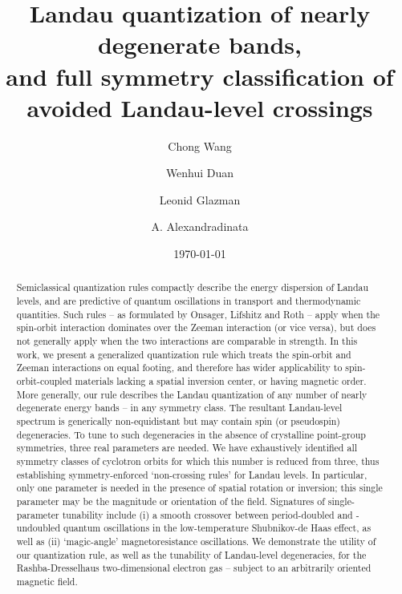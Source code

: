\documentclass[aps, showpacs, twocolumn, notitlepage, superscriptaddress]{revtex4-1}
\begin{document}
\title{Landau quantization of nearly degenerate bands, \\
and full symmetry classification of avoided Landau-level crossings}

\author{Chong Wang}
\author{Wenhui Duan}
\author{Leonid Glazman}
\author{A. Alexandradinata}


\begin{abstract}
Semiclassical quantization rules compactly describe the energy dispersion of Landau levels, and are predictive of quantum oscillations in transport and thermodynamic quantities. Such rules -- as formulated by Onsager, Lifshitz and Roth --
apply when the spin-orbit interaction dominates over the Zeeman interaction (or vice versa), but does not generally apply when the two interactions are comparable in strength. In this work, we present a generalized quantization rule which treats the spin-orbit and Zeeman interactions on equal footing, and therefore has wider applicability to spin-orbit-coupled materials lacking a spatial inversion center, or having magnetic order. More generally, our rule describes the Landau quantization of any number of nearly degenerate energy bands -- in any symmetry class. The resultant Landau-level spectrum is generically non-equidistant but may contain spin (or pseudospin) degeneracies. To tune to such degeneracies in the absence of crystalline point-group symmetries, three real parameters are needed. We have exhaustively identified all symmetry classes of cyclotron orbits for which this number is reduced from three, thus establishing symmetry-enforced `non-crossing rules' for Landau levels.
In particular, only one parameter is needed {in the presence of} spatial rotation {or inversion}; this single parameter may be the magnitude or orientation of the field. Signatures of single-parameter tunability include (i) a smooth crossover between period-doubled and -undoubled quantum oscillations in the low-temperature Shubnikov-de Haas effect, as well as (ii) `magic-angle' magnetoresistance oscillations. We demonstrate the utility of our quantization rule, as well as the tunability of Landau-level degeneracies, for the Rashba-Dresselhaus two-dimensional electron gas -- subject to an arbitrarily oriented magnetic field.
\end{abstract}
\date{\today}
\end{document}
